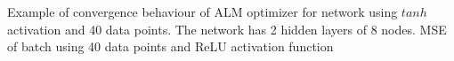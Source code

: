 \documentclass[11pt,t]{beamer}
\begin{document}
\begin{frame}
\centering
\footnotesize
{}
Example of convergence behaviour of ALM optimizer for network using $tanh$ activation and 40 data points. The network has 2 hidden layers of 8 nodes.
MSE of  batch using 40 data points and ReLU activation function
\end{frame}
\end{document}
